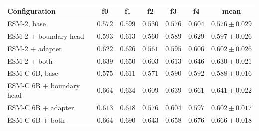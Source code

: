 \begin{tabular}{lccccc c}
\toprule
\textbf{Configuration} & \textbf{f0} & \textbf{f1} & \textbf{f2} & \textbf{f3} & \textbf{f4} & \textbf{mean} \\
\midrule
ESM-2, base & $0.572$ & $0.599$ & $0.530$ & $0.576$ & $0.604$ & $0.576 \pm 0.029$ \\
ESM-2 + boundary head & $0.593$ & $0.613$ & $0.560$ & $0.589$ & $0.629$ & $0.597 \pm 0.026$ \\
ESM-2 + adapter & $0.622$ & $0.626$ & $0.561$ & $0.595$ & $0.606$ & $0.602 \pm 0.026$ \\
ESM-2 + both & $0.639$ & $0.650$ & $0.603$ & $0.613$ & $0.646$ & $0.630 \pm 0.021$ \\
ESM-C 6B, base & $0.575$ & $0.611$ & $0.571$ & $0.590$ & $0.592$ & $0.588 \pm 0.016$ \\
ESM-C 6B + boundary head & $0.664$ & $0.634$ & $0.609$ & $0.639$ & $0.661$ & $0.641 \pm 0.022$ \\
ESM-C 6B + adapter & $0.613$ & $0.618$ & $0.576$ & $0.604$ & $0.597$ & $0.602 \pm 0.017$ \\
ESM-C 6B + both & $0.664$ & $0.690$ & $0.643$ & $0.658$ & $0.676$ & $0.666 \pm 0.018$ \\
\bottomrule
\end{tabular}
